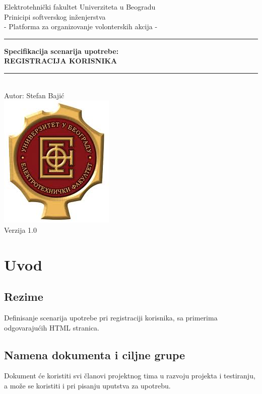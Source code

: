 \documentclass[11pt,a4paper]{article}
\begin{document}
\begin{titlepage}

\centering
\textnormal{\large Elektrotehnički fakultet Univerziteta u Beogradu}\\[0.1cm]
\textnormal{\large Prinicipi softverskog inženjerstva}\\[3cm]

\textnormal{\normalsize - Platforma za organizovanje volonterskih akcija -}\\\vspace{-5mm}
\rule{\textwidth}{0.4pt}
{\huge \bfseries Specifikacija scenarija upotrebe:\\ 
REGISTRACIJA KORISNIKA\par}\vspace{-1mm}
\rule{\textwidth}{0.4pt}\\\vspace{1mm}
\textnormal{\large Autor: Stefan Bajić}\\[6cm]

\includegraphics[scale=0.5]{logo.jpg}\\
\vfill
\textnormal{\normalsize Verzija 1.0}\\

\end{titlepage}

\tableofcontents

\newpage

\section{Uvod}
\subsection{Rezime}
Definisanje scenarija upotrebe pri registraciji korisnika, sa primerima odgovarajućih HTML stranica.
\subsection{Namena dokumenta i ciljne grupe}
Dokument će koristiti svi članovi projektnog tima u razvoju projekta i testiranju, a može se koristiti i pri pisanju uputstva za upotrebu.
\end{document}
